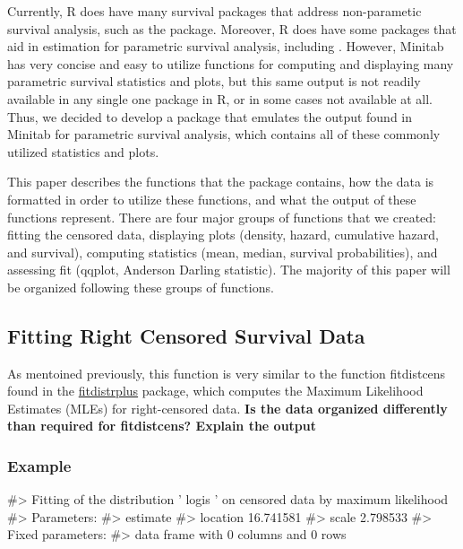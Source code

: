 Currently, R does have many survival packages that address non-parametic
survival analysis, such as the  package. Moreover, R does
have some packages that aid in estimation for parametric survival
analysis, including . However, Minitab has very
concise and easy to utilize functions for computing and displaying many
parametric survival statistics and plots, but this same output is not
readily available in any single one package in R, or in some cases not
available at all. Thus, we decided to develop a package that emulates
the output found in Minitab for parametric survival analysis, which
contains all of these commonly utilized statistics and plots.

This paper describes the functions that the  package
contains, how the data is formatted in order to utilize these functions,
and what the output of these functions represent. There are four major
groups of functions that we created: fitting the censored data,
displaying plots (density, hazard, cumulative hazard, and survival),
computing statistics (mean, median, survival probabilities), and
assessing fit (qqplot, Anderson Darling statistic). The majority of this
paper will be organized following these groups of functions.

\hypertarget{fitting-right-censored-survival-data}{%
\subsection{Fitting Right Censored Survival
Data}\label{fitting-right-censored-survival-data}}

As mentoined previously, this function is very similar to the function
fitdistcens found in the
\href{https://cran.r-project.org/web/packages/fitdistrplus/index.html}{fitdistrplus}
package, which computes the Maximum Likelihood Estimates (MLEs) for
right-censored data. \textbf{Is the data organized differently than
required for fitdistcens? Explain the output}

\hypertarget{example}{%
\subsubsection{Example}\label{example}}

\begin{Schunk}
\begin{Soutput}
#> Fitting of the distribution ' logis ' on censored data by maximum likelihood 
#> Parameters:
#>           estimate
#> location 16.741581
#> scale     2.798533
#> Fixed parameters:
#> data frame with 0 columns and 0 rows
\end{Soutput}
\end{Schunk}


